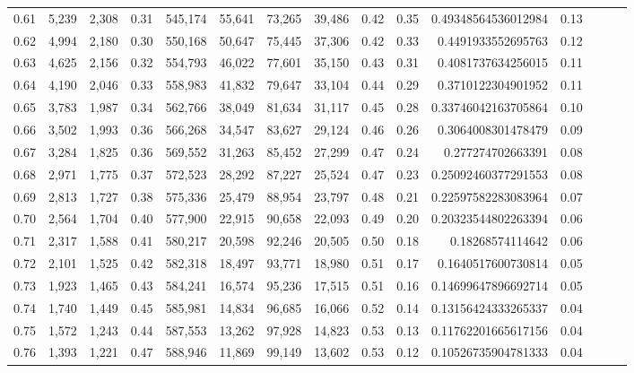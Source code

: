 \begin{tabular}{rrrrrrrrrrrrrrr}
0.61 &   5,239 &  2,308 &  0.31 &  545,174 &   55,641 &   73,265 &   39,486 &  0.42 &  0.35 &   0.49348564536012984 &      0.13 \\
0.62 &   4,994 &  2,180 &  0.30 &  550,168 &   50,647 &   75,445 &   37,306 &  0.42 &  0.33 &    0.4491933552695763 &      0.12 \\
0.63 &   4,625 &  2,156 &  0.32 &  554,793 &   46,022 &   77,601 &   35,150 &  0.43 &  0.31 &    0.4081737634256015 &      0.11 \\
0.64 &   4,190 &  2,046 &  0.33 &  558,983 &   41,832 &   79,647 &   33,104 &  0.44 &  0.29 &    0.3710122304901952 &      0.11 \\
0.65 &   3,783 &  1,987 &  0.34 &  562,766 &   38,049 &   81,634 &   31,117 &  0.45 &  0.28 &   0.33746042163705864 &      0.10 \\
0.66 &   3,502 &  1,993 &  0.36 &  566,268 &   34,547 &   83,627 &   29,124 &  0.46 &  0.26 &    0.3064008301478479 &      0.09 \\
0.67 &   3,284 &  1,825 &  0.36 &  569,552 &   31,263 &   85,452 &   27,299 &  0.47 &  0.24 &     0.277274702663391 &      0.08 \\
0.68 &   2,971 &  1,775 &  0.37 &  572,523 &   28,292 &   87,227 &   25,524 &  0.47 &  0.23 &   0.25092460377291553 &      0.08 \\
0.69 &   2,813 &  1,727 &  0.38 &  575,336 &   25,479 &   88,954 &   23,797 &  0.48 &  0.21 &   0.22597582283083964 &      0.07 \\
0.70 &   2,564 &  1,704 &  0.40 &  577,900 &   22,915 &   90,658 &   22,093 &  0.49 &  0.20 &   0.20323544802263394 &      0.06 \\
0.71 &   2,317 &  1,588 &  0.41 &  580,217 &   20,598 &   92,246 &   20,505 &  0.50 &  0.18 &      0.18268574114642 &      0.06 \\
0.72 &   2,101 &  1,525 &  0.42 &  582,318 &   18,497 &   93,771 &   18,980 &  0.51 &  0.17 &    0.1640517600730814 &      0.05 \\
0.73 &   1,923 &  1,465 &  0.43 &  584,241 &   16,574 &   95,236 &   17,515 &  0.51 &  0.16 &   0.14699647896692714 &      0.05 \\
0.74 &   1,740 &  1,449 &  0.45 &  585,981 &   14,834 &   96,685 &   16,066 &  0.52 &  0.14 &   0.13156424333265337 &      0.04 \\
0.75 &   1,572 &  1,243 &  0.44 &  587,553 &   13,262 &   97,928 &   14,823 &  0.53 &  0.13 &   0.11762201665617156 &      0.04 \\
0.76 &   1,393 &  1,221 &  0.47 &  588,946 &   11,869 &   99,149 &   13,602 &  0.53 &  0.12 &   0.10526735904781333 &      0.04 \\

\end{tabular}
